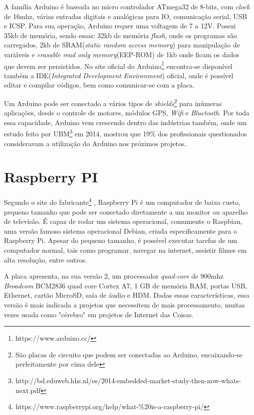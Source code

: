 A família Arduino é baseada no micro controlador ATmega32 de 8-bits, com \textit{clock} de 16mhz, várias entradas digitais e analógicas para IO, comunicação serial, USB e ICSP. Para sua operação, Arduino requer uma voltagem de 7 a 12V. Possui 35kb de memória, sendo essas: 32kb de memória \textit{flash}, onde os programas são carregados, 2kb de SRAM(\textit{static random access memory}) para manipulação de variáveis e \textit{erasable read only memory}(EEP-ROM) de 1kb  onde ficam os dados que devem ser persistidos. No site oficial do Arduino\footnote{https://www.arduino.cc/} encontra-se disponível também a IDE(\textit{Integrated Development Environment}) oficial, onde é possível editar e compilar códigos, bem como comunicar-se com a placa.

Um Arduino pode ser conectado a vários tipos de \textit{shields}\footnote{São placas de circuito que podem ser conectadas ao Arduino, encaixando-se perfeitamente por cima dele} para inúmeras aplicações, desde o controle de motores, módulos GPS, \textit{Wifi} e \textit{Bluetooth}. Por toda essa capacidade, Arduino vem crescendo dentro das indústrias também, onde um estudo feito por UBM\footnote{http://bd.eduweb.hhs.nl/es/2014-embedded-market-study-then-now-whats-next.pdf} em 2014, mostrou que 19\% dos profissionais questionados consideravam a utilização do Arduino nos próximos projetos.
\section{Raspberry PI}

Segundo o site do fabricante\footnote{https://www.raspberrypi.org/help/what-\%20is-a-raspberry-pi/} , Raspberry Pi é um computador de baixo custo, pequeno tamanho que pode ser conectado diretamente a um monitor ou aparelho de televisão. É capaz de rodar um sistema operacional, comumente o Raspbian, uma versão famoso sistema operacional Debian, criada especificamente para o Raspberry Pi. Apesar do pequeno tamanho, é possível executar tarefas de um computador normal, tais como programar, navegar na internet, assistir filmes em alta resolução, entre outros. 

A placa apresenta, na sua versão 2, um processador \textit{quad-core} de 900mhz  \textit{Broadcom} BCM2836 quad core Cortex A7, 1 GB de memória RAM, portas USB, Ethernet, cartão MicroSD, saía de áudio e HDM. Dadas essas características, essa versão é mais indicada a projetos que necessitem de mais processamento, muitas vezes usada como "cérebro" em projetos de Internet das Coisas.

